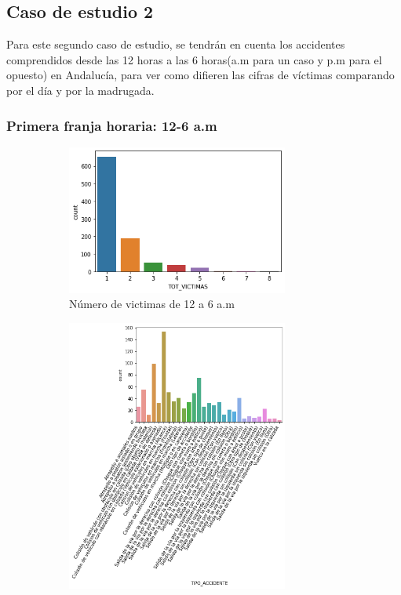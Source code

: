 \subsection{Caso de estudio 2}

Para este segundo caso de estudio, se tendrán en cuenta los accidentes comprendidos desde las 12 horas a las 6 horas(a.m para un caso y p.m para el opuesto) en Andalucía, para ver como difieren las cifras de víctimas comparando por el día y por la madrugada.

\subsubsection{Primera franja horaria: 12-6 a.m}

\begin{figure}[H]
\begin{subfigure}{.5\textwidth}
  \centering
  \includegraphics[width=0.8\textwidth]{imagenes/victimas_caso2.png}
  \caption{Número de victimas de 12 a 6 a.m}
  \label{fig:sfig1}
\end{subfigure}%
\begin{subfigure}{.5\textwidth}
  \centering
  \includegraphics[width=0.8\textwidth]{imagenes/tipo_accidente_caso2.png}

\end{subfigure}
\end{figure}
